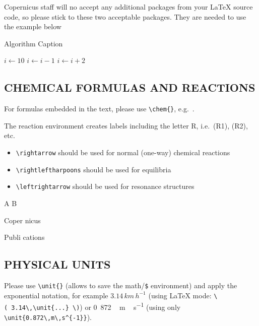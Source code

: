 \documentclass[gmd, manuscript]{copernicus}
\begin{document}
Copernicus staff will no accept any additional packages from your LaTeX
source code, so please stick to these two acceptable packages. They are
needed to use the example below

\begin{algorithm}
\caption{Algorithm Caption}
\label{a1}
\begin{algorithmic}
\STATE $i\gets 10$
        \STATE $i\gets i-1$
\ELSE
                \STATE $i\gets i+2$
        \ENDIF
\ENDIF
\end{algorithmic}
\end{algorithm}

\subsection{CHEMICAL FORMULAS AND REACTIONS}

For formulas embedded in the text, please use
\texttt{\textbackslash{}chem\{\}}, e.g.~.

The reaction environment creates labels including the letter R,
i.e.~(R1), (R2), etc.

\begin{itemize}
\item
  \texttt{\textbackslash{}rightarrow} should be used for normal
  (one-way) chemical reactions
\item
  \texttt{\textbackslash{}rightleftharpoons} should be used for
  equilibria
\item
  \texttt{\textbackslash{}leftrightarrow} should be used for resonance
  structures
\end{itemize}

\begin{reaction}
A \rightarrow B \\
\end{reaction}
\begin{reaction}
Coper \rightleftharpoons nicus \\
\end{reaction}
\begin{reaction}
Publi \leftrightarrow cations
\end{reaction}

\subsection{PHYSICAL UNITS}

Please use \texttt{\textbackslash{}unit\{\}} (allows to save the
math/\texttt{\$} environment) and apply the exponential notation, for
example \(3.14\,\unit{km\,h^{-1}}\) (using LaTeX mode:
\texttt{\textbackslash{}(\ 3.14\textbackslash{},\textbackslash{}unit\{...\}\ \textbackslash{})})
or \unit{0.872\,m\,s^{-1}} (using only
\texttt{\textbackslash{}unit\{0.872\textbackslash{},m\textbackslash{},s\^{}\{-1\}\}}).
\end{document}
